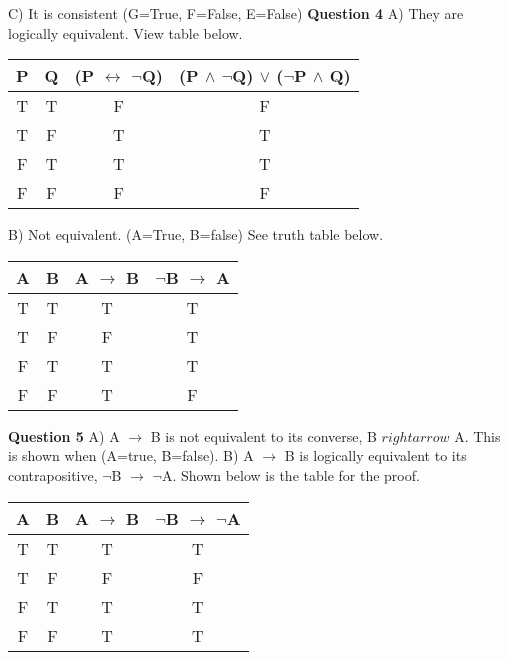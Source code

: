\documentclass{article}
\begin{document}
C) It is consistent (G=True, F=False, E=False)\newline
\newline
\textbf{Question 4}\newline
A) They are logically equivalent. View table below.\newline
\begin{center}
\begin{tabular}{ |c|c|c|c| } 
 \hline
 P & Q & (P $\leftrightarrow$ $\neg$Q) & (P $\wedge$ $\neg$Q) $\lor$ ($\neg$P $\wedge$ Q)\\
\hline
T & T & F & F\\
T & F & T & T\\
F & T & T & T\\
F & F & F & F\\
\hline
\end{tabular}
\end{center}

B) Not equivalent. (A=True, B=false) See truth table below.\newline
\begin{center}
\begin{tabular}{ |c|c|c|c| } 
 \hline
 A & B & A $\rightarrow$ B & $\neg$B $\rightarrow$ A\\
\hline
T & T & T & T\\
T & F & F & T\\
F & T & T & T\\
F & F & T & F\\
\hline
\end{tabular}
\end{center}

\textbf{Question 5}\newline
A) A $\rightarrow$ B is not equivalent to its converse, B $rightarrow$ A. This is shown when (A=true, B=false).\newline
B)  A $\rightarrow$ B is logically equivalent to its contrapositive, $\neg$B $\rightarrow$ $\neg$A. Shown below is the table for the proof.\newline

\begin{center}
\begin{tabular}{ |c|c|c|c| }
\hline
A & B & A $\rightarrow$ B & $\neg$B $\rightarrow$ $\neg$A\\
\hline
T & T & T & T\\
T & F & F & F\\
F & T & T & T\\
F & F & T & T\\
\hline
\end{tabular}
\end{center}
\end{document}
